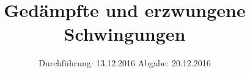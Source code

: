

\subject{V354}
\title{Gedämpfte und erzwungene Schwingungen}
\date{
\centering
  Durchführung: 13.12.2016
  \hspace{3em}
  Abgabe: 20.12.2016
}



\maketitle
\thispagestyle{empty}
\tableofcontents
\newpage








\printbibliography


